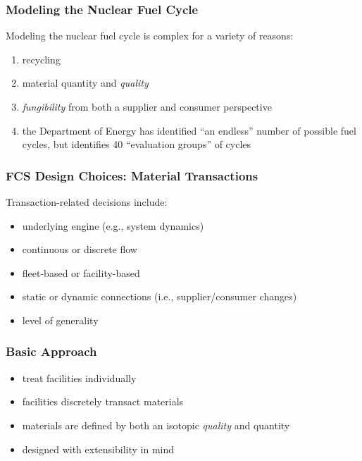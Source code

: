 
\begin{frame}[ctb!]
  \frametitle{Modeling the Nuclear Fuel Cycle}

  Modeling the nuclear fuel cycle is complex for a variety of reasons:

  \begin{enumerate}
    \item recycling
    \item material quantity and \textit{quality}
    \item \textit{fungibility} from both a supplier and consumer perspective
    \item the Department of Energy has identified ``an endless'' number of
      possible fuel cycles, but identifies 40 ``evaluation groups'' of cycles
      \cite{wigeland_evaluation_2013}
  \end{enumerate}

\end{frame}

\begin{frame}[ctb!]
  \frametitle{FCS Design Choices: Material Transactions}

  Transaction-related decisions include:
  \begin{itemize}
    \item underlying engine (e.g., system dynamics)
    \item continuous or discrete flow
    \item fleet-based or facility-based
    \item static or dynamic connections (i.e., supplier/consumer changes)
    \item level of generality
  \end{itemize}

\end{frame}

\begin{frame}[ctb!]
  \frametitle{Basic \Cyclus Approach}

  \begin{itemize}
    \item treat facilities individually
    \item facilities discretely transact materials
    \item materials are defined by both an isotopic \textit{quality} and
      quantity
    \item designed with extensibility in mind
  \end{itemize}

\end{frame}

